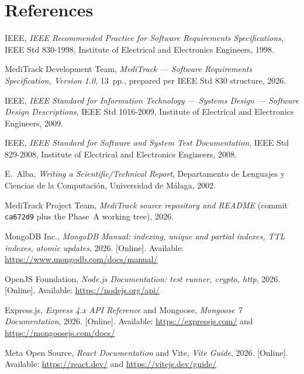 \documentclass[11pt,a4paper]{article}
\begin{document}
\clearpage
\section*{References}
\begin{enumerate}[label={[\arabic*]},leftmargin=2.2em,itemsep=2pt,topsep=2pt]
  \item IEEE, \emph{IEEE Recommended Practice for Software Requirements Specifications}, IEEE Std 830-1998, Institute of Electrical and Electronics Engineers, 1998.
  \item MediTrack Development Team, \emph{MediTrack --- Software Requirements Specification, Version 1.0}, 13~pp., prepared per IEEE Std 830 structure, 2026.
  \item IEEE, \emph{IEEE Standard for Information Technology --- Systems Design --- Software Design Descriptions}, IEEE Std 1016-2009, Institute of Electrical and Electronics Engineers, 2009.
  \item IEEE, \emph{IEEE Standard for Software and System Test Documentation}, IEEE Std 829-2008, Institute of Electrical and Electronics Engineers, 2008.
  \item E.~Alba, \emph{Writing a Scientific/Technical Report}, Departamento de Lenguajes y Ciencias de la Computaci\'on, Universidad de M\'alaga, 2002.
  \item MediTrack Project Team, \emph{MediTrack source repository and README} (commit \texttt{ca672d9} plus the Phase~A working tree), 2026.
  \item MongoDB Inc., \emph{MongoDB Manual: indexing, unique and partial indexes, TTL indexes, atomic updates}, 2026. [Online]. Available: \url{https://www.mongodb.com/docs/manual/}
  \item OpenJS Foundation, \emph{Node.js Documentation: test runner, crypto, http}, 2026. [Online]. Available: \url{https://nodejs.org/api/}
  \item Express.js, \emph{Express 4.x API Reference} and Mongoose, \emph{Mongoose 7 Documentation}, 2026. [Online]. Available: \url{https://expressjs.com/} and \url{https://mongoosejs.com/docs/}
  \item Meta Open Source, \emph{React Documentation} and Vite, \emph{Vite Guide}, 2026. [Online]. Available: \url{https://react.dev/} and \url{https://vitejs.dev/guide/}
\end{enumerate}
\end{document}
